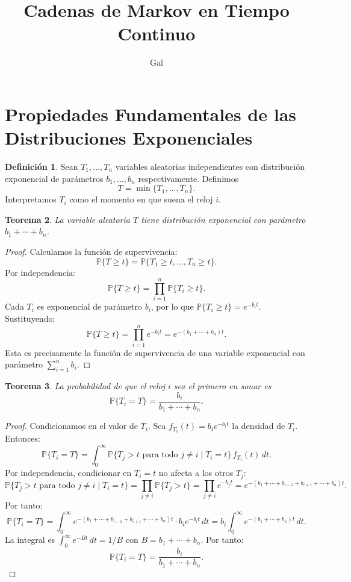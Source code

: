 \documentclass{article}
\title{Cadenas de Markov en Tiempo Continuo}
\author{Gal}
\date{}
\theoremstyle{plain}
\newtheorem{Teorema}{Teorema}[section]
\theoremstyle{definition}
\newtheorem{Definicion}[Teorema]{Definici\'on}
\newcommand{\Prob}{\mathbb{P}}
\begin{document}
\maketitle

\section{Propiedades Fundamentales de las Distribuciones Exponenciales}

\begin{Definicion}
  Sean $T_1, \ldots, T_n$ variables aleatorias independientes con distribuci\'on exponencial de par\'ametros $b_1, \ldots, b_n$ respectivamente. Definimos
  \[ T = \min\{T_1, \ldots, T_n\}. \]
  Interpretamos $T_i$ como el momento en que suena el reloj $i$.
\end{Definicion}

\begin{Teorema}
  La variable aleatoria $T$ tiene distribuci\'on exponencial con par\'ametro $b_1 + \cdots + b_n$.
\end{Teorema}

\begin{proof}
  Calculamos la funci\'on de supervivencia:
  \[
  \Prob\{T \geq t\} = \Prob\{T_1 \geq t, \ldots, T_n \geq t\}.
  \]
  Por independencia:
  \[
  \Prob\{T \geq t\} = \prod_{i=1}^n \Prob\{T_i \geq t\}.
  \]
  Cada $T_i$ es exponencial de par\'ametro $b_i$, por lo que $\Prob\{T_i \geq t\} = e^{-b_i t}$. Sustituyendo:
  \[
  \Prob\{T \geq t\} = \prod_{i=1}^n e^{-b_i t} = e^{-(b_1 + \cdots + b_n)t}.
  \]
  Esta es precisamente la funci\'on de supervivencia de una variable exponencial con par\'ametro $\sum_{i=1}^n b_i$.
\end{proof}

\begin{Teorema}
  La probabilidad de que el reloj $i$ sea el primero en sonar es
  \[ \Prob\{T_i = T\} = \frac{b_i}{b_1 + \cdots + b_n}. \]
\end{Teorema}

\begin{proof}
  Condicionamos en el valor de $T_i$. Sea $f_{T_i}(t) = b_i e^{-b_i t}$ la densidad de $T_i$. Entonces:
  \[
  \Prob\{T_i = T\} = \int_0^\infty \Prob\{T_j > t \text{ para todo } j \neq i \mid T_i = t\} \, f_{T_i}(t) \, dt.
  \]
  Por independencia, condicionar en $T_i = t$ no afecta a los otros $T_j$:
  \[
  \Prob\{T_j > t \text{ para todo } j \neq i \mid T_i = t\} = \prod_{j \neq i} \Prob\{T_j > t\} = \prod_{j \neq i} e^{-b_j t} = e^{-(b_1 + \cdots + b_{i-1} + b_{i+1} + \cdots + b_n)t}.
  \]
  Por tanto:
  \[
  \Prob\{T_i = T\} = \int_0^\infty e^{-(b_1 + \cdots + b_{i-1} + b_{i+1} + \cdots + b_n)t} \cdot b_i e^{-b_i t} \, dt = b_i \int_0^\infty e^{-(b_1 + \cdots + b_n)t} \, dt.
  \]
  La integral es $\int_0^\infty e^{-Bt} \, dt = 1/B$ con $B = b_1 + \cdots + b_n$. Por tanto:
  \[
  \Prob\{T_i = T\} = \frac{b_i}{b_1 + \cdots + b_n}.
  \]
\end{proof}
\end{document}
